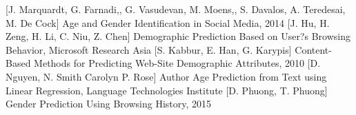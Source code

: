 \begin{thebibliography}{9}
 [J. Marquardt, G. Farnadi,, G. Vasudevan, M. Moens,, S. Davalos, A. Teredesai, M. De Cock]  Age and Gender Identification in Social Media, 2014
 [J. Hu, H. Zeng, H. Li, C. Niu, Z. Chen] Demographic Prediction Based on User?s Browsing Behavior, Microsoft Research Asia
 [S. Kabbur, E. Han, G. Karypis] Content-Based Methods for Predicting Web-Site Demographic Attributes, 2010
 [D. Nguyen, N. Smith Carolyn P. Rose] Author Age Prediction from Text using Linear Regression, Language Technologies Institute
 [D. Phuong, T. Phuong] Gender Prediction Using Browsing History, 2015
\end{thebibliography}
